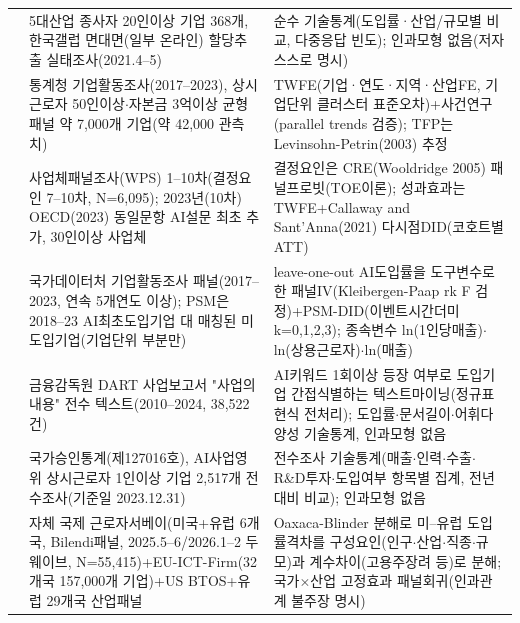\documentclass[11pt]{article}
\begin{document}
\begin{longtable}{L{2.5cm}L{6.4cm}L{6.4cm}}
\citet{kim-2021-ai-adoption-status-major-industries} &
5대산업 종사자 20인이상 기업 368개, 한국갤럽 면대면(일부 온라인) 할당추출 실태조사(2021.4--5) &
순수 기술통계(도입률·산업/규모별 비교, 다중응답 빈도); 인과모형 없음(저자 스스로 명시)\\

\citet{kim-2025-ai-adoption-firm-performance} &
통계청 기업활동조사(2017--2023), 상시근로자 50인이상$\cdot$자본금 3억이상 균형패널 약 7,000개 기업(약 42,000 관측치) &
TWFE(기업·연도·지역·산업FE, 기업단위 클러스터 표준오차)+사건연구(parallel trends 검증); TFP는 Levinsohn-Petrin(2003) 추정\\

\citet{lee-2025-ai-adoption-determinants-performance} &
사업체패널조사(WPS) 1--10차(결정요인 7--10차, N=6,095); 2023년(10차) OECD(2023) 동일문항 AI설문 최초 추가, 30인이상 사업체 &
결정요인은 CRE(Wooldridge 2005) 패널프로빗(TOE이론); 성과효과는 TWFE+Callaway and Sant'Anna(2021) 다시점DID(코호트별 ATT)\\

\citet{nam-2026-ai-macroeconomic-impact-analysis} &
국가데이터처 기업활동조사 패널(2017--2023, 연속 5개연도 이상); PSM은 2018--23 AI최초도입기업 대 매칭된 미도입기업(기업단위 부분만) &
leave-one-out AI도입률을 도구변수로 한 패널IV(Kleibergen-Paap rk F 검정)+PSM-DID(이벤트시간더미 k=0,1,2,3); 종속변수 ln(1인당매출)$\cdot$ln(상용근로자)$\cdot$ln(매출)\\

\citet{seo-2025-ai-adoption-characteristics-business-reports} &
금융감독원 DART 사업보고서 "사업의 내용" 전수 텍스트(2010--2024, 38,522건) &
AI키워드 1회이상 등장 여부로 도입기업 간접식별하는 텍스트마이닝(정규표현식 전처리); 도입률$\cdot$문서길이$\cdot$어휘다양성 기술통계, 인과모형 없음\\

\citet{spri-2024-ai-industry-survey} &
국가승인통계(제127016호), AI사업영위 상시근로자 1인이상 기업 2,517개 전수조사(기준일 2023.12.31) &
전수조사 기술통계(매출$\cdot$인력$\cdot$수출$\cdot$R\&D투자$\cdot$도입여부 항목별 집계, 전년대비 비교); 인과모형 없음\\

\citet{bick-2026-mind-the-gap-ai-adoption} &
자체 국제 근로자서베이(미국+유럽 6개국, Bilendi패널, 2025.5--6/2026.1--2 두 웨이브, N=55,415)+EU-ICT-Firm(32개국 157,000개 기업)+US BTOS+유럽 29개국 산업패널 &
Oaxaca-Blinder 분해로 미--유럽 도입률격차를 구성요인(인구$\cdot$산업$\cdot$직종$\cdot$규모)과 계수차이(고용주장려 등)로 분해; 국가$\times$산업 고정효과 패널회귀(인과관계 불주장 명시)\\


\end{longtable}
\end{document}
